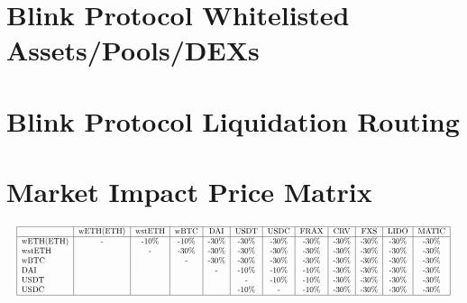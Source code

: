 \documentclass[conference]{IEEEtran}
\begin{document}
\begin{appendices}
\section{Blink Protocol Whitelisted Assets/Pools/DEXs}
\section{Blink Protocol Liquidation Routing}
\section{Market Impact Price Matrix}
$$\resizebox{\textwidth}{!}{\begin{tabular}{|l|c|c|c|c|c|c|c|c|c|c|c|c|c|}
  \hline
   & wETH(ETH) & wstETH & wBTC & DAI & USDT & USDC & FRAX & CRV & FXS & LIDO & MATIC \\
  \hline
  wETH(ETH) & - & -10$\%$ & -10$\%$ & -30$\%$ & -30$\%$ & -30$\%$ & -30$\%$ & -30$\%$ & -30$\%$ & -30$\%$ & -30$\%$  \\
  wstETH &  & - & -30$\%$ & -30$\%$ & -30$\%$ & -30$\%$ & -30$\%$ & -30$\%$ & -30$\%$ & -30$\%$ & -30$\%$\\
  wBTC &  &  & - & -30$\%$ & -30$\%$ & -30$\%$ & -30$\%$ & -30$\%$ & -30$\%$ & -30$\%$ & -30$\%$ \\
  DAI &  &  &  & - & -10$\%$ & -10$\%$ & -10$\%$ & -30$\%$ & -30$\%$ & -30$\%$ & -30$\%$ \\
  USDT &  &  &  &  & - & -10$\%$ & -10$\%$ & -30$\%$ & -30$\%$ & -30$\%$ & -30$\%$\\
 USDC &  &  &  &  & -10$\%$ & - & -10$\%$ & -30$\%$ & -30$\%$ & -30$\%$ & -30$\%$\\
  \hline
\end{tabular}}$$
\end{appendices}
\end{document}
